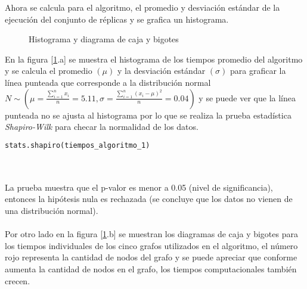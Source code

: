 \documentclass[a4paper, 11pt]{article}
\begin{document}
Ahora se calcula para el algoritmo, el promedio y desviación estándar de la ejecución del conjunto de réplicas y se grafica un histograma.

\begin{figure}[H]
\centering
{}
\caption{Histograma y diagrama de caja y bigotes} \label{figure3}
\end{figure}

En la figura [\ref{figure3}.a] se muestra el histograma de los tiempos promedio del algoritmo y se calcula el promedio $(\mu)$ y la desviación estándar $(\sigma)$ para graficar la línea punteada que corresponde a la distribución normal $N\sim(\mu=\frac{\sum_{i=1}^n x_{i}}{n}=5.11, \sigma=\frac{\sum_{i=1}^n {(x_{i}-\mu)}^2}{n}=0.04)$ y se puede ver que la línea punteada no se ajusta al histograma por lo que se realiza la prueba estadística \textit{Shapiro-Wilk} para checar la normalidad de los datos.

\begin{lstlisting}[language=Python]
stats.shapiro(tiempos_algoritmo_1)
\end{lstlisting}

\noindent{}
\\
\\
La prueba muestra que el p-valor es menor a 0.05 (nivel de significancia), entonces la hipótesis nula es rechazada (se concluye que los datos no vienen de una distribución normal).
\\
\\
Por otro lado en la figura [\ref{figure3}.b] se muestran los diagramas de caja y bigotes para los tiempos individuales de los cinco grafos utilizados en el algoritmo, el número rojo representa la cantidad de nodos del grafo y se puede apreciar que conforme aumenta la cantidad de nodos en el grafo, los tiempos computacionales también crecen.


\newpage


\subsection*{}
\end{document}
